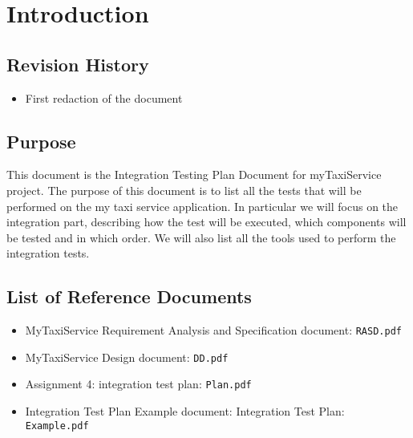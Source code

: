 \section{Introduction}

\subsection{Revision History}
\begin{itemize}
	\item \date{15/01/2016} First redaction of the document
\end{itemize}

\subsection{Purpose}
This document is the Integration Testing Plan Document for myTaxiService project.
The purpose of this document is to list all the tests that will be performed on the my taxi service application. 
In particular we will focus on the integration part, describing how the test will be executed, which components will be tested and in which order.
We will also list all the tools used to perform the integration tests.

\subsection{List of Reference Documents}
\begin{itemize}
	\item MyTaxiService Requirement Analysis and Specification document: \texttt{RASD.pdf}
	\item MyTaxiService Design document:  \texttt{DD.pdf}
	\item Assignment 4: integration test plan: 	\texttt{Plan.pdf}
	\item Integration Test Plan Example document: Integration Test Plan: \texttt{Example.pdf}
\end{itemize}
